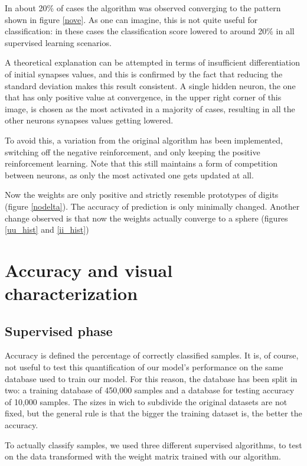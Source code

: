 \documentclass[a4paper]{report}
\begin{document}
In about 20\% of cases the algorithm was observed converging to the pattern shown in figure \ref{nove}. As one can imagine, this is not quite useful for classification: in these cases the classification score lowered to around 20\% in all supervised learning scenarios.

A theoretical explanation can be attempted in terms of insufficient differentiation of initial synapses values, and this is confirmed by the fact that reducing the standard deviation makes this result consistent. A single hidden neuron, the one that has only positive value at convergence, in the upper right corner of this image, is chosen as the most activated in a majority of cases, resulting in all the other neurons synapses values getting lowered.

To avoid this, a variation from the original algorithm has been implemented, switching off the negative reinforcement, and only keeping the positive reinforcement learning. Note that this still maintains a form of competition between neurons, as only the most activated one gets updated at all.

Now the weights are only positive and strictly resemble prototypes of digits (figure \ref{nodelta}). The accuracy of prediction is only minimally changed. Another change observed is that now the weights actually converge to a sphere (figures \ref{uu_hist} and \ref{ii_hist})

\chapter{Accuracy and visual characterization}
\section{Supervised phase}

Accuracy is defined the percentage of correctly classified samples. It is, of course, not useful to test this quantification of our model's performance on the same database used to train our model. For this reason, the database has been split in two: a training database of 450,000 samples and a database for testing accuracy of 10,000 samples. The sizes in wich to subdivide the original datasets are not fixed, but the general rule is that the bigger the training dataset is, the better the accuracy.

To actually classify samples, we used three different supervised algorithms, to test on the data transformed with the weight matrix trained with our algorithm.
\end{document}
